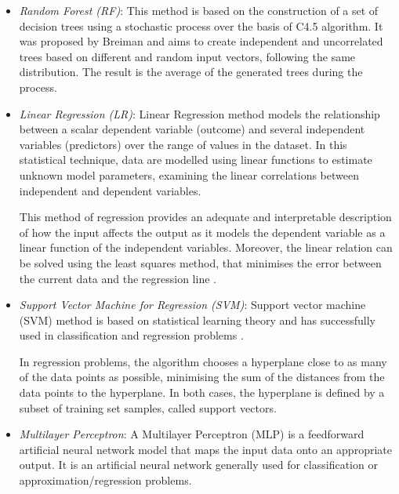 \documentclass[a4paper,10pt,twocolumn,preprint,3p]{elsarticle}
\begin{document}
\begin{itemize}
 \item \emph{Random Forest (RF)}: This method is based on the
 construction of a set of decision trees using a stochastic process
 over the basis of C4.5 algorithm. It was proposed by Breiman
 \cite{Breiman2001} and aims to create independent and uncorrelated
 trees based on different and random input vectors, following the
  same distribution. 
The result is the average of the generated trees during the process.


 \item \emph{Linear Regression (LR)}:
 Linear Regression \cite{Cohen2003,Yan2009,Rencher2102,EnkeT05} method models the 
relationship between a scalar dependent variable (outcome) and several independent 
variables (predictors) over the range of values in the dataset. 
In this statistical technique, data are modelled using linear functions to estimate unknown model parameters, examining the linear correlations between independent and dependent variables.

This method of regression provides an adequate and interpretable description of 
how the input affects the output as it models the dependent variable as a linear 
function of the independent variables. Moreover, the linear relation can be 
solved using the least squares method, that minimises the error between the 
current data and the regression line \cite{McClendon2015}.


 \item \emph{Support Vector Machine for Regression (SVM)}:
Support vector machine (SVM) \cite{Cortes1995,Shevade1999,MinSVM05} method is based on 
statistical learning theory and has successfully used in classification and  
regression problems \cite{Cao2003,Jari2008}.

In regression problems, the algorithm chooses a hyperplane close to as many 
of the data points as possible, minimising the sum of the distances from 
the data points to the hyperplane. 
In both cases, the hyperplane is defined by a subset of training set samples, 
called support vectors.



 \item \emph{Multilayer Perceptron}:
A Multilayer Perceptron (MLP) \cite{Rosenblatt1962,Widrow1990} is a feedforward 
artificial neural network model that maps the input data onto an appropriate output. 
It is an artificial neural network generally used for classification or 
approximation/regression problems.


\end{itemize}
\end{document}
